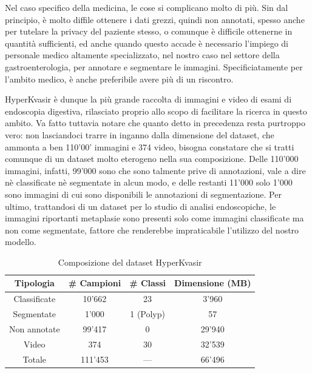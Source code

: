 Nel caso specifico della medicina, le cose si complicano
molto di più.
Sin dal principio, è molto diffile ottenere i dati grezzi,
quindi non annotati, spesso anche per tutelare la privacy
del paziente stesso, o comunque è difficile ottenerne in
quantità sufficienti, ed anche quando questo accade
è necessario l'impiego di personale medico altamente
specializzato, nel nostro caso nel settore della
gastroenterologia, per annotare e segmentare le immagini.
Specificiatamente per l'ambito medico, è anche preferibile
avere più di un riscontro.

HyperKvasir è dunque la più grande raccolta di immagini
e video di esami di endoscopia digestiva, rilasciato proprio
allo scopo di facilitare la ricerca in questo ambito.
Va fatto tuttavia notare che quanto detto in precedenza resta
purtroppo vero:
non lasciandoci trarre in inganno dalla dimensione del dataset,
che ammonta a ben 110'00' immagini e 374 video, bisogna
constatare che si tratti comunque di un dataset molto
eterogeno nella sua composizione.
Delle 110'000 immagini, infatti, 99'000 sono che sono
talmente prive di annotazioni, vale a dire nè classificate
nè segmentate in alcun modo, e delle restanti 11'000
solo 1'000 sono immagini di cui sono disponibili
le annotazioni di segmentazione.
Per ultimo, trattandosi di un dataset per lo studio
di analisi endoscopiche, le immagini riportanti metaplasie
sono presenti solo come immagini classificate ma non come
segmentate, fattore che renderebbe impraticabile
l'utilizzo del nostro modello.

\begin{table}
    \center
    \begin{tabular}{||c|c|c|c||}
        \hline
        Tipologia & \# Campioni & \# Classi & Dimensione (MB) \\
        \hline
        \hline
        Classificate & 10'662 & 23 & 3'960 \\
        \hline
        Segmentate & 1'000 & 1 (Polyp) & 57 \\
        \hline
        Non annotate & 99'417 & 0 & 29'940 \\
        \hline
        Video & 374 & 30 & 32'539 \\
        \hline
        \hline
        Totale & 111'453 & --- & 66'496 \\
        \hline
    \end{tabular}
    \caption{\label{tab:hyperkvasir}Composizione del dataset HyperKvasir}
\end{table}

